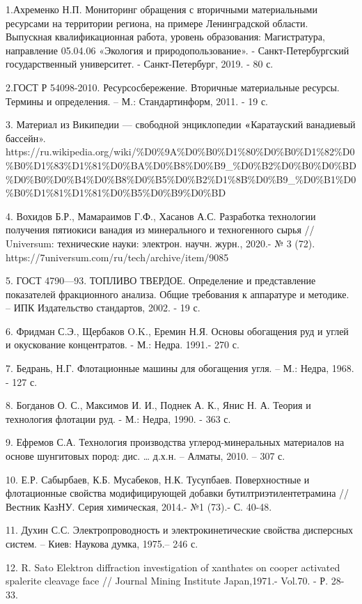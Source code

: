 1.Ахременко Н.П. Мониторинг обращения с вторичными материальными
ресурсами на территории региона, на примере Ленинградской области.
Выпускная квалификационная работа, уровень образования: Магистратура,
направление 05.04.06 «Экология и природопользование». -
Санкт-Петербургский государственный университет. - Санкт-Петербург,
2019. - 80 с.

2.ГОСТ Р 54098-2010. Ресурсосбережение. Вторичные материальные ресурсы.
Термины и определения. -- М.: Стандартинформ, 2011. - 19 с.

3. Материал из Википедии --- свободной энциклопедии
\textbf{«}Каратауский ванадиевый бассейн».
https://ru.wikipedia.org/wiki/\%D0\%9A\%D0\%B0\%D1\%80\%D0\%B0\%D1\%82\%D0\%B0\%D1\%83\%D1\%81\%D0\%BA\%D0\%B8\%D0\%B9\_\%D0\%B2\%D0\%B0\%D0\%BD\%D0\%B0\%D0\%B4\%D0\%B8\%D0\%B5\%D0\%B2\%D1\%8B\%D0\%B9\_\%D0\%B1\%D0\%B0\%D1\%81\%D1\%81\%D0\%B5\%D0\%B9\%D0\%BD

4. Вохидов Б.Р., Мамараимов Г.Ф., Хасанов А.С. Разработка технологии
получения пятиокиси ванадия из минерального и техногенного сырья //
Universum: технические науки: электрон. научн. журн., 2020.- № 3 (72).
https://7universum.com/ru/tech/archive/item/9085

5. ГОСТ 4790---93. ТОПЛИВО ТВЕРДОЕ. Определение и представление
показателей фракционного анализа. Общие требования к аппаратуре и
методике. -- ИПК Издательство стандартов, 2002. - 19 с.

6. Фридман С.Э., Щербаков O.K., Еремин Н.Я. Основы обогащения руд и
углей и окускование концентратов. - М.: Недра. 1991.- 270 с.

7. Бедрань, Н.Г. Флотационные машины для обогащения угля. -- М.: Недра,
1968. - 127 с.

8. Богданов О. С., Максимов И. И., Поднек А. К., Янис Н. А. Теория и
технология флотации руд. - М.: Недра, 1990. - 363 с.

9. Ефремов С.А. Технология производства углерод-минеральных материалов
на основе шунгитовых пород: дис. \ldots{} д.х.н. -- Алматы, 2010. -- 307
с.

10. Е.Р. Сабырбаев, К.Б. Мусабеков, Н.К. Тусупбаев. Поверхностные и
флотационные свойства модифицирующей добавки бутилтриэтилентетрамина //
Вестник КазНУ. Серия химическая, 2014.- №1 (73).- С. 40-48.

11. Духин С.С. Электропроводность и электрокинетические свойства
дисперсных систем. -- Киев: Наукова думка, 1975.-- 246 с.

12. R. Sato Elektron diffraction investigation of xanthates on cooper
activated spalerite cleavage face // Journal Mining Institute
Japan,1971.- Vol.70. - Р. 28-33.

